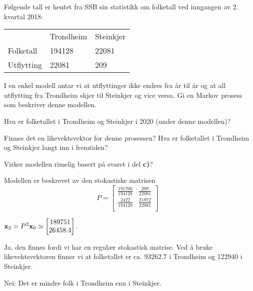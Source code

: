 \begin{oppgave}
Følgende tall er hentet fra SSB sin statistikk om folketall ved inngangen av 2. kvartal 2018:

\begin{table}[h]
\begin{tabular}{lll}
           & Trondheim & Steinkjer \\
Folketall & 194128    & 22081     \\
Utflytting & 22081     & 209      
\end{tabular}
\end{table}

\begin{punkt}
I en enkel modell antar vi at utflyttinger ikke endres fra år til år og at all utflytting fra Trondheim skjer til Steinkjer og vice versa. Gi en Markov prosess som beskriver denne modellen.
\end{punkt}

\begin{punkt}
Hva er folketallet i Trondheim og Steinkjer i 2020 (under denne modellen)?
\end{punkt}

\begin{punkt}
Finnes det en likevektsvektor for denne prosessen? Hva er folketallet i Trondheim og Steinkjer langt inn i fremtiden?
\end{punkt}

\begin{punkt}
Virker modellen rimelig basert på svaret i del \textbf{c)}?
\end{punkt}

\end{oppgave}

\begin{losning}


\begin{punkt}
Modellen er beskrevet av den stokastiske matrisen $$P=\begin{bmatrix}
\frac{191706}{194128} & \frac{209}{22081}\\
\frac{2422}{194128} & \frac{21872}{22081}\\
\end{bmatrix}$$
\end{punkt}

\begin{punkt}
$\mathbf{x}_2=P^2\mathbf{x}_0\simeq \begin{bmatrix} 189751 \\ 26458.4 \end{bmatrix}$.
\end{punkt}

\begin{punkt}
Ja, den finnes fordi vi har en regulær stokastisk matrise. Ved å bruke likevektsvektoren finner vi at folketallet er ca. 93262.7 i Trondheim og 122940 i Steinkjer.
\end{punkt}

\begin{punkt}
Nei: Det er mindre folk i Trondheim enn i Steinkjer.
\end{punkt}

\end{losning}


